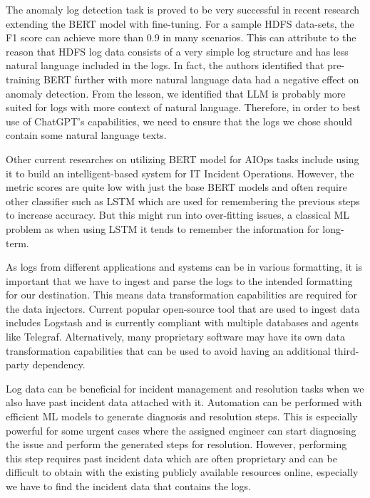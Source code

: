\documentclass[conference]{IEEEtran}
\begin{document}
The anomaly log detection task is proved to be very successful in recent research extending the BERT model with fine-tuning. For a sample HDFS data-sets, the F1 score can achieve more than 0.9 in many scenarios. This can attribute to the reason that HDFS log data consists of a very simple log structure and has less natural language included in the logs. In fact, the authors identified that pre-training BERT further with more natural language data had a negative effect on anomaly detection. \cite{LEE2023110689} From the lesson, we identified that LLM is probably more suited for logs with more context of natural language. Therefore, in order to best use of ChatGPT's capabilities, we need to ensure that the logs we chose should contain some natural language texts.

Other current researches on utilizing BERT model for AIOps tasks include using it to build an intelligent-based system for IT Incident Operations. However, the metric scores are quite low with just the base BERT models and often require other classifier such as LSTM which are used for remembering the previous steps to increase accuracy. But this might run into over-fitting issues, a classical ML problem as when using LSTM it tends to remember the information for long-term. \cite{10189040}

As logs from different applications and systems can be in various formatting, it is important that we have to ingest and parse the logs to the intended formatting for our destination. This means data transformation capabilities are required for the data injectors. Current popular open-source tool that are used to ingest data includes Logstash and is currently compliant with multiple databases and agents like Telegraf. Alternatively, many proprietary software may have its own data transformation capabilities that can be used to avoid having an additional third-party dependency. \cite{bendimerad2023onpremise}

Log data can be beneficial for incident management and resolution tasks when we also have past incident data attached with it. Automation can be performed with efficient ML models to generate diagnosis and resolution steps. This is especially powerful for some urgent cases where the assigned engineer can start diagnosing the issue and perform the generated steps for resolution. However, performing this step requires past incident data which are often proprietary and can be difficult to obtain with the existing publicly available resources online, especially we have to find the incident data that contains the logs. \cite{bendimerad2023onpremise}
\end{document}

